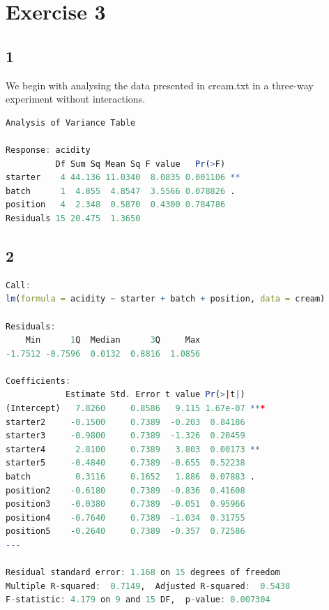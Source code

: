 \documentclass{article}
\begin{document}
  \section*{Exercise 3}
    \subsection*{1}
    We begin with analysing the data presented in cream.txt in a three-way experiment without interactions. 
      \begin{lstlisting}[language=R]
Analysis of Variance Table

Response: acidity
          Df Sum Sq Mean Sq F value   Pr(>F)   
starter    4 44.136 11.0340  8.0835 0.001106 **
batch      1  4.855  4.8547  3.5566 0.078826 . 
position   4  2.348  0.5870  0.4300 0.784786   
Residuals 15 20.475  1.3650                    
      \end{lstlisting}
      
    
    \subsection*{2}
      \begin{lstlisting}[language=R]
Call:
lm(formula = acidity ~ starter + batch + position, data = cream)

Residuals:
    Min      1Q  Median      3Q     Max 
-1.7512 -0.7596  0.0132  0.8816  1.0856 

Coefficients:
            Estimate Std. Error t value Pr(>|t|)    
(Intercept)   7.8260     0.8586   9.115 1.67e-07 ***
starter2     -0.1500     0.7389  -0.203  0.84186    
starter3     -0.9800     0.7389  -1.326  0.20459    
starter4      2.8100     0.7389   3.803  0.00173 ** 
starter5     -0.4840     0.7389  -0.655  0.52238    
batch         0.3116     0.1652   1.886  0.07883 .  
position2    -0.6180     0.7389  -0.836  0.41608    
position3    -0.0380     0.7389  -0.051  0.95966    
position4    -0.7640     0.7389  -1.034  0.31755    
position5    -0.2640     0.7389  -0.357  0.72586    
---

Residual standard error: 1.168 on 15 degrees of freedom
Multiple R-squared:  0.7149,  Adjusted R-squared:  0.5438 
F-statistic: 4.179 on 9 and 15 DF,  p-value: 0.007304
      \end{lstlisting}
      \label{tble:estimates}
\end{document}

